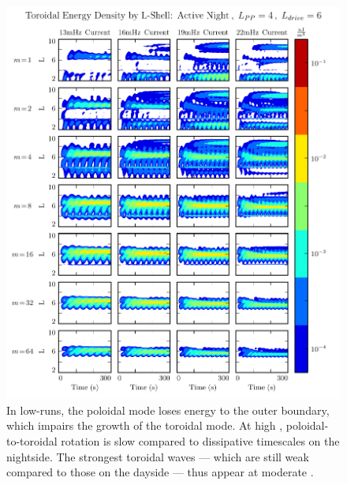 \begin{figure}[!htb]
    \centering
    \includegraphics[width=\textwidth]{figures/layers_t_3_4_6.pdf}
    \caption[Radial Distribution of Toroidal Energy: Active Night]{
      In low-\azm runs, the poloidal mode loses energy to the outer boundary, which impairs the growth of the toroidal mode. At high \azm, poloidal-to-toroidal rotation is slow compared to dissipative timescales on the nightside. The strongest toroidal waves --- which are still weak compared to those on the dayside --- thus appear at moderate \azm. 
    }
    \label{fig_layers_t_3_4_6}
\end{figure}


